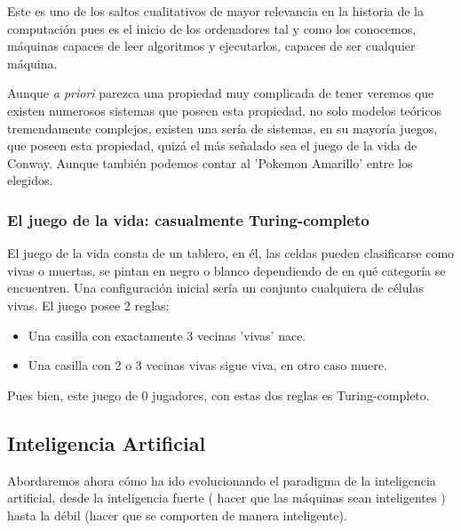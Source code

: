 Este es uno de los saltos cualitativos de mayor relevancia en la historia de la computación pues es el inicio de los ordenadores tal y como los conocemos, máquinas capaces de leer algoritmos y ejecutarlos, capaces de ser cualquier máquina.

\vspace{10px}

Aunque \textit{a priori} parezca una propiedad muy complicada de tener veremos que existen numerosos sistemas que poseen esta propiedad, no solo modelos teóricos tremendamente complejos, existen una sería de sistemas, en su mayoría juegos, que poseen esta propiedad, quizá el más señalado sea el juego de la vida de Conway. Aunque también podemos contar al 'Pokemon Amarillo' entre los elegidos.




\subsubsection{El juego de la vida: casualmente Turing-completo}

El juego de la vida consta de un tablero, en él, las celdas pueden clasificarse como vivas o muertas, se pintan en negro o blanco dependiendo de en qué categoría se encuentren. Una configuración inicial sería un conjunto cualquiera de células vivas. El juego posee 2 reglas:

\begin{multicols}{2}
	\begin{itemize}
		\item Una casilla con exactamente 3 vecinas 'vivas' nace.
		\item Una casilla con 2 o 3 vecinas vivas sigue viva, en otro caso muere.
	\end{itemize}
\end{multicols}


Pues bien, este juego de 0 jugadores, con estas dos reglas es Turing-completo.

\subsection{Inteligencia Artificial}

Abordaremos ahora cómo ha ido evolucionando el paradigma de la inteligencia artificial, desde la inteligencia fuerte ( hacer que las máquinas sean inteligentes ) hasta la débil (hacer que se comporten de manera inteligente).

